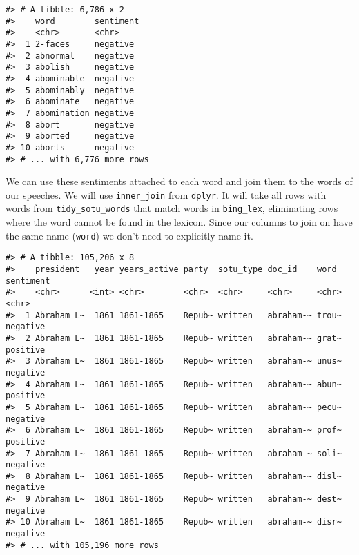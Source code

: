 \documentclass[]{book}
\newenvironment{Shaded}{\begin{snugshade}}{\end{snugshade}}
\newcommand{\CommentTok}[1]{\textcolor[rgb]{0.56,0.35,0.01}{\textit{#1}}}
\newcommand{\KeywordTok}[1]{\textcolor[rgb]{0.13,0.29,0.53}{\textbf{#1}}}
\newcommand{\NormalTok}[1]{#1}
\newcommand{\OperatorTok}[1]{\textcolor[rgb]{0.81,0.36,0.00}{\textbf{#1}}}
\newcommand{\StringTok}[1]{\textcolor[rgb]{0.31,0.60,0.02}{#1}}
\begin{document}
\begin{verbatim}
#> # A tibble: 6,786 x 2
#>    word        sentiment
#>    <chr>       <chr>    
#>  1 2-faces     negative 
#>  2 abnormal    negative 
#>  3 abolish     negative 
#>  4 abominable  negative 
#>  5 abominably  negative 
#>  6 abominate   negative 
#>  7 abomination negative 
#>  8 abort       negative 
#>  9 aborted     negative 
#> 10 aborts      negative 
#> # ... with 6,776 more rows
\end{verbatim}

We can use these sentiments attached to each word and join them to the words of our speeches. We will use \texttt{inner\_join} from \texttt{dplyr}. It will take all rows with words from \texttt{tidy\_sotu\_words} that match words in \texttt{bing\_lex}, eliminating rows where the word cannot be found in the lexicon. Since our columns to join on have the same name (\texttt{word}) we don't need to explicitly name it.

\begin{Shaded}
\end{Shaded}

\begin{verbatim}
#> # A tibble: 105,206 x 8
#>    president   year years_active party  sotu_type doc_id    word  sentiment
#>    <chr>      <int> <chr>        <chr>  <chr>     <chr>     <chr> <chr>    
#>  1 Abraham L~  1861 1861-1865    Repub~ written   abraham-~ trou~ negative 
#>  2 Abraham L~  1861 1861-1865    Repub~ written   abraham-~ grat~ positive 
#>  3 Abraham L~  1861 1861-1865    Repub~ written   abraham-~ unus~ negative 
#>  4 Abraham L~  1861 1861-1865    Repub~ written   abraham-~ abun~ positive 
#>  5 Abraham L~  1861 1861-1865    Repub~ written   abraham-~ pecu~ negative 
#>  6 Abraham L~  1861 1861-1865    Repub~ written   abraham-~ prof~ positive 
#>  7 Abraham L~  1861 1861-1865    Repub~ written   abraham-~ soli~ negative 
#>  8 Abraham L~  1861 1861-1865    Repub~ written   abraham-~ disl~ negative 
#>  9 Abraham L~  1861 1861-1865    Repub~ written   abraham-~ dest~ negative 
#> 10 Abraham L~  1861 1861-1865    Repub~ written   abraham-~ disr~ negative 
#> # ... with 105,196 more rows
\end{verbatim}
\end{document}
